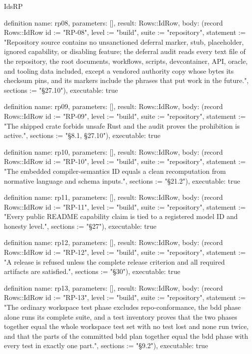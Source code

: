 \begin{lexlean}{IdsRP}
\begin{semanticmodule}
definition{
  name: rp08,
  parameters: [],
  result: Rows::IdRow,
  body: (record Rows::IdRow {id := "RP-08", level := "build", suite := "repository", statement := "Repository source contains no unsanctioned deferral marker, stub, placeholder, ignored capability, or disabling feature; the deferral audit reads every text file of the repository, the root documents, workflows, scripts, devcontainer, API, oracle, and tooling data included, except a vendored authority copy whose bytes its checksum pins, and its markers include the phrases that put work in the future.", sections := "§27.10"}),
  executable: true
}

definition{
  name: rp09,
  parameters: [],
  result: Rows::IdRow,
  body: (record Rows::IdRow {id := "RP-09", level := "build", suite := "repository", statement := "The shipped crate forbids unsafe Rust and the audit proves the prohibition is active.", sections := "§8.1, §27.10"}),
  executable: true
}

definition{
  name: rp10,
  parameters: [],
  result: Rows::IdRow,
  body: (record Rows::IdRow {id := "RP-10", level := "build", suite := "repository", statement := "The embedded compiler-semantics ID equals a clean recomputation from normative language and schema inputs.", sections := "§21.2"}),
  executable: true
}

definition{
  name: rp11,
  parameters: [],
  result: Rows::IdRow,
  body: (record Rows::IdRow {id := "RP-11", level := "build", suite := "repository", statement := "Every public README capability claim is tied to a registered model ID and honesty level.", sections := "§27"}),
  executable: true
}

definition{
  name: rp12,
  parameters: [],
  result: Rows::IdRow,
  body: (record Rows::IdRow {id := "RP-12", level := "build", suite := "repository", statement := "A release is refused unless the complete release criterion and all required artifacts are satisfied.", sections := "§30"}),
  executable: true
}

definition{
  name: rp13,
  parameters: [],
  result: Rows::IdRow,
  body: (record Rows::IdRow {id := "RP-13", level := "build", suite := "repository", statement := "The ordinary workspace test phase excludes repo-conformance, the bdd phase alone runs its complete suite, and a test inventory proves that the two phases together equal the whole workspace test set with no test lost and none run twice, and that the parts of the committed bdd plan together equal the bdd phase with every test in exactly one part.", sections := "§9.2"}),
  executable: true
}


\end{semanticmodule}
\end{lexlean}
